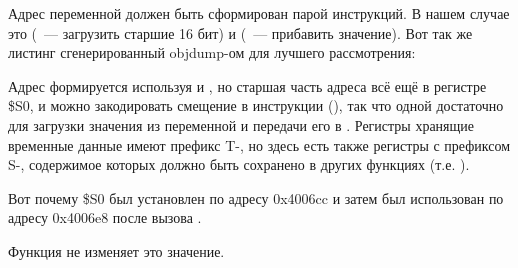 Адрес переменной должен быть сформирован парой инструкций.
В нашем случае это  (~--- загрузить старшие 16 бит) и 
 (~--- прибавить значение).
Вот так же листинг сгенерированный objdump-ом для лучшего рассмотрения:



Адрес формируется используя  и , но старшая часть адреса
всё ещё в регистре \$S0, и можно закодировать смещение в инструкции  (), так что одной
 достаточно для загрузки значения из переменной и передачи его в \printf.
Регистры хранящие временные данные имеют префикс T-, но здесь есть также регистры с префиксом S-,
содержимое которых должно быть сохранено в других функциях (т.е. ).

Вот почему \$S0 был установлен по адресу 0x4006cc и затем был использован по адресу 0x4006e8
после вызова \scanf.

Функция \scanf не изменяет это значение.

